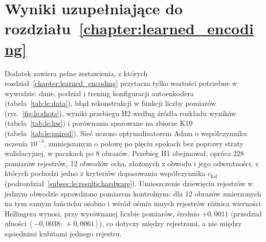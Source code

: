 
\section{Wyniki uzupełniające do rozdziału~\ref{chapter:learned_encoding}}\label{app:results:le}


Dodatek zawiera pełne zestawienia, z których rozdział~\ref{chapter:learned_encoding} przytacza tylko wartości potrzebne w wywodzie: dane, podział i trening konfiguracji autoenkodera (tabela~\ref{tab:le:data}), błąd rekonstrukcji w funkcji liczby pomiarów (rys.~\ref{fig:le:shots}), wyniki przebiegu H2 według źródła rozkładu wyników (tabela~\ref{tab:le:hw}) i porównania sparowane na zbiorze K10 (tabela~\ref{tab:le:paired}).
Sieć uczono optymalizatorem Adam o współczynniku uczenia $10^{-3}$, zmniejszanym o połowę po pięciu epokach bez poprawy straty walidacyjnej, w paczkach po 8 obrazów.
Przebieg H1 obejmował, oprócz 228 pomiarów rejestrów, 12 obwodów echa, złożonych z obwodu i jego odwrotności, z których pochodzi jedno z kryteriów dopasowania współczynnika $c_{\mathrm{kal}}$ (podrozdział~\ref{subsec:le:results:hardware}).
Umieszczenie dziewięciu rejestrów w jednym obwodzie sprawdzono pomiarem kontrolnym: dla 12 obrazów zmierzonych na tym samym łańcuchu osobno i wśród ośmiu innych rejestrów różnica wierności Hellingera wynosi, przy wyrównanej liczbie pomiarów, średnio $+0{,}0011$ (przedział ufności $[-0{,}0038;\,+0{,}0061]$), co dotyczy  między rejestrami, a nie między sąsiednimi kubitami jednego rejestru.

